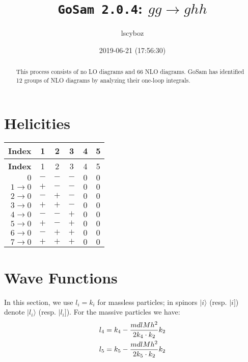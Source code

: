 \documentclass[a4paper]{article}
\title{\texttt{GoSam 2.0.4}: ${g}{g}\rightarrow{g}{h}{h}$}
\author{lscyboz}
\date{2019-06-21 (17:56:30)}
\newcommand{\kea}[1]{\vert #1 \rangle}
\newcommand{\keb}[1]{\vert #1 ]}
\begin{document}
\maketitle
\begin{abstract}
\noindent This process consists of no LO diagrams and 66 NLO diagrams. GoSam has identified 12 groups  of NLO diagrams by analyzing their one-loop integrals.
\end{abstract}
\newpage
\tableofcontents
\newpage

\section{Helicities}

\begin{longtable}[c]{r|ccccc}
\bf{Index} &1&2&3&4&5\\
\hline
\endfirsthead
\bf{Index} &1&2&3&4&5\\
\hline
\endhead 
$0$& $-$& $-$& $-$& $0$& $0$\\
$1\rightarrow 0$& $+$& $-$& $-$& $0$& $0$\\
$2\rightarrow 0$& $-$& $+$& $-$& $0$& $0$\\
$3\rightarrow 0$& $+$& $+$& $-$& $0$& $0$\\
$4\rightarrow 0$& $-$& $-$& $+$& $0$& $0$\\
$5\rightarrow 0$& $+$& $-$& $+$& $0$& $0$\\
$6\rightarrow 0$& $-$& $+$& $+$& $0$& $0$\\
$7\rightarrow 0$& $+$& $+$& $+$& $0$& $0$\\
\end{longtable}
\section{Wave Functions}
In this section, we use $l_i=k_i$ for massless particles;
in spinors $\kea{i}$ (resp. $\keb{i}$) denote $\kea{l_i}$ (resp. $\keb{l_i}$).
For the massive particles we have:
\begin{align}
l_{4} &= k_{4} - \frac{mdlMh^2}{%
      2 k_{4}\cdot k_{2}}k_{2}\\
l_{5} &= k_{5} - \frac{mdlMh^2}{%
      2 k_{5}\cdot k_{2}}k_{2}
\end{align}
\end{document}
